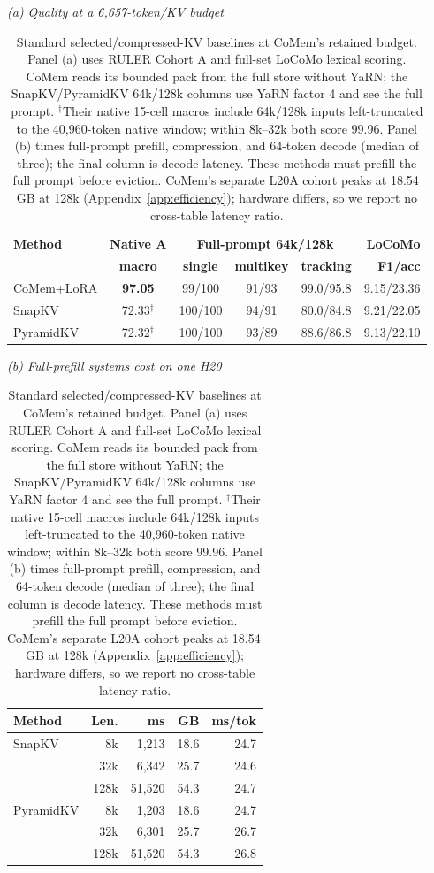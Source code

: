\begin{table}[!t]
\centering
\scriptsize
\setlength{\tabcolsep}{3.2pt}
\begin{minipage}[t]{0.59\textwidth}
\centering
\textit{(a) Quality at a 6,657-token/KV budget}\\[-2pt]
\begin{tabular}{@{}lccccr@{}}
\toprule
\textbf{Method} & \textbf{Native A} & \multicolumn{3}{c}{\textbf{Full-prompt 64k/128k}} & \textbf{LoCoMo} \\
& \textbf{macro} & \textbf{single} & \textbf{multikey} & \textbf{tracking} & \textbf{F1/acc} \\
\midrule
CoMem+LoRA & \textbf{97.05} & 99/100 & 91/93 & 99.0/95.8 & 9.15/23.36 \\
SnapKV & 72.33$^{\dagger}$ & 100/100 & 94/91 & 80.0/84.8 & 9.21/22.05 \\
PyramidKV & 72.32$^{\dagger}$ & 100/100 & 93/89 & 88.6/86.8 & 9.13/22.10 \\
\bottomrule
\end{tabular}
\end{minipage}
\hfill
\begin{minipage}[t]{0.38\textwidth}
\centering
\textit{(b) Full-prefill systems cost on one H20}\\[-2pt]
\begin{tabular}{@{}lrrrr@{}}
\toprule
\textbf{Method} & \textbf{Len.} & \textbf{ms} & \textbf{GB} & \textbf{ms/tok} \\
\midrule
SnapKV & 8k & 1,213 & 18.6 & 24.7 \\
& 32k & 6,342 & 25.7 & 24.6 \\
& 128k & 51,520 & 54.3 & 24.7 \\
PyramidKV & 8k & 1,203 & 18.6 & 24.7 \\
& 32k & 6,301 & 25.7 & 26.7 \\
& 128k & 51,520 & 54.3 & 26.8 \\
\bottomrule
\end{tabular}
\end{minipage}
\caption{Standard selected/compressed-KV baselines at CoMem's retained budget.
Panel (a) uses RULER Cohort A and full-set LoCoMo lexical scoring. CoMem reads
its bounded pack from the full store without YaRN; the SnapKV/PyramidKV 64k/128k
columns use YaRN factor 4 and see the full prompt. $^{\dagger}$Their native
15-cell macros include 64k/128k inputs left-truncated to the 40,960-token native
window; within 8k--32k both score 99.96. Panel (b) times full-prompt prefill,
compression, and 64-token decode (median of three); the final column is decode
latency. These methods must prefill the full prompt before eviction. CoMem's
separate L20A cohort peaks at 18.54\,GB at 128k
(Appendix~\ref{app:efficiency}); hardware differs, so we report no cross-table latency
ratio.}
\label{tab:kvcompress}
\end{table}
